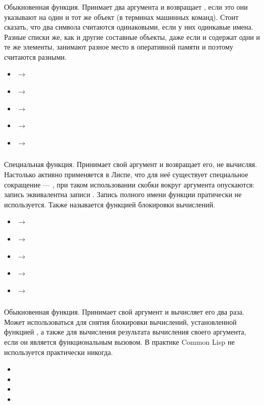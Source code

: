 \documentclass[a4paper, 12pt, titlepage, twoside]{article}
\newenvironment{examples}
               {\begin{itemize}\renewcommand{\labelitemi}{ }}
               {\end{itemize}}
\begin{document}
\subsubsection{}
Обыкновенная функция. Принмает два аргумента и возвращает , если это они указывают на один и тот же объект (в терминах машинных команд). Стоит сказать, что два символа считаются одинаковыми, если у них одинкавые имена. Разные списки же, как и другие составные объекты, даже если и содержат одни и те же элементы, занимают разное место в оперативной памяти и поэтому считаются разными.
\begin{examples}
\item {} $\longrightarrow$ 
\item {} $\longrightarrow$ 
\item {} $\longrightarrow$ 
\item {} $\longrightarrow$ 
\item {} $\longrightarrow$ 
\end{examples}
\subsubsection{}
Специальная функция. Принимает свой аргумент и возвращает его, не вычисляя. Настолько активно применяется в Лиспе, что для неё существует специальное сокращение --- , при таком использовании скобки вокруг аргумента опускаются: запись  эквивалентна записи . Запись полного имени функции пратически не используется. Также называется функцией блокировки вычислений.
\begin{examples}
\item {} $\longrightarrow$ 
\item {} $\longrightarrow$ 
\item {} $\longrightarrow$ 
\item {} $\longrightarrow$ 
\item {} $\longrightarrow$ 
\end{examples}
\subsubsection{}
Обыкновенная функция. Принимает свой аргумент и вычисляет его два раза. Может использоваться для снятия блокировки вычислений, установленной функцией , а также для вычисления результата вычисления своего аргумента, если он является функциональным вызовом. В практике Common Lisp не используется практически никогда.
\begin{examples}
\item {}
\item {}
\item {}
\item {}
\end{examples}
\end{document}
